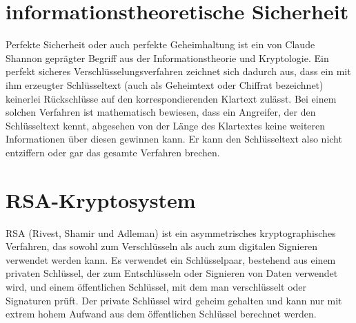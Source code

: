 \section{informationstheoretische Sicherheit}
Perfekte Sicherheit oder auch perfekte Geheimhaltung ist ein von Claude Shannon geprägter Begriff aus der Informationstheorie und Kryptologie. Ein perfekt sicheres Verschlüsselungsverfahren zeichnet sich dadurch aus, dass ein mit ihm erzeugter Schlüsseltext (auch als Geheimtext oder Chiffrat bezeichnet) keinerlei Rückschlüsse auf den korrespondierenden Klartext zulässt. Bei einem solchen Verfahren ist mathematisch bewiesen, dass ein Angreifer, der den Schlüsseltext kennt, abgesehen von der Länge des Klartextes keine weiteren Informationen über diesen gewinnen kann. Er kann den Schlüsseltext also nicht entziffern oder gar das gesamte Verfahren brechen.

\section{RSA-Kryptosystem}
RSA (Rivest, Shamir und Adleman) ist ein asymmetrisches kryptographisches Verfahren, das sowohl zum Verschlüsseln als auch zum digitalen Signieren verwendet werden kann. Es verwendet ein Schlüsselpaar, bestehend aus einem privaten Schlüssel, der zum Entschlüsseln oder Signieren von Daten verwendet wird, und einem öffentlichen Schlüssel, mit dem man verschlüsselt oder Signaturen prüft. Der private Schlüssel wird geheim gehalten und kann nur mit extrem hohem Aufwand aus dem öffentlichen Schlüssel berechnet werden.